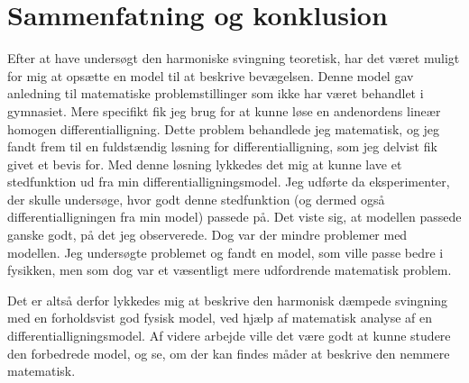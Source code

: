 \chapter{Sammenfatning og konklusion}
Efter at have undersøgt den harmoniske svingning teoretisk, har det været muligt for mig at opsætte en model til at beskrive bevægelsen. 
Denne model gav anledning til matematiske problemstillinger som ikke har været behandlet i gymnasiet.
Mere specifikt fik jeg brug for at kunne løse en andenordens lineær homogen differentialligning. 
Dette problem behandlede jeg matematisk, og jeg fandt frem til en fuldstændig løsning for differentialligning, som jeg delvist fik givet et bevis for. 
Med denne løsning lykkedes det mig at kunne lave et stedfunktion ud fra min differentialligningsmodel.
Jeg udførte da eksperimenter, der skulle undersøge, hvor godt denne stedfunktion (og dermed også differentialligningen fra min model) passede på.
Det viste sig, at modellen passede ganske godt, på det jeg observerede.
Dog var der mindre problemer med modellen.
Jeg undersøgte problemet og fandt en model, som ville passe bedre i fysikken, men som dog var et væsentligt mere udfordrende matematisk problem.

Det er altså derfor lykkedes mig at beskrive den harmonisk dæmpede svingning med en forholdsvist god fysisk model, ved hjælp af matematisk analyse af en differentialligningsmodel. 
Af videre arbejde ville det være godt at kunne studere den forbedrede model, og se, om der kan findes måder at beskrive den nemmere matematisk. 